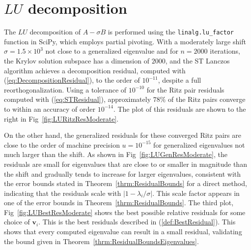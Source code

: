 \section{$LU$ decomposition}

The $LU$ decomposition of $A - \sigma B$ is performed using the \texttt{linalg.lu\_factor} function in SciPy, which employs partial pivoting. With a moderately large shift $\sigma = 1.5 \times 10^3$ not close to a generalized eigenvalue and for $n = 2000$ iterations, the Krylov solution subspace has a dimension of $2000$, and the ST Lanczos algorithm achieves a decomposition residual, computed with (\ref{eq:DecompositionResidual}), to the order of $10^{-11}$, despite a full reorthogonalization. Using a tolerance of $10^{-10}$ for the Ritz pair residuals computed with (\ref{eq:STResidual}), approximately $78\%$ of the Ritz pairs converge to within an accuracy of order $10^{-14}$. The plot of this residuals are shown to the right in Fig~\ref{fig:LURitzResModerate}.

On the other hand, the generalized residuals for these converged Ritz pairs are close to the order of machine precision $u=10^{-15}$ for generalized eigenvalues not much larger than the shift. As shown in Fig~\ref{fig:LUGenResModerate}, the residuals are small for eigenvalues that are close to or smaller in magnitude than the shift and gradually tends to increase for larger eigenvalues, consistent with the error bounds stated in Theorem~\ref{thrm:ResidualBounds} for a direct method, indicating that the residuals scale with $\lvert 1-\lambda_i/\sigma\rvert$. This scale factor appears in one of the error bounds in Theorem~\ref{thrm:ResidualBounds}. The third plot, Fig~\ref{fig:LUBestResModerate} shows the best possible relative residuals for some choice of $\mathbf{v}_i$. This is the best residuals described in (\ref{def:BestResidual}). This shows that every computed eigenvalue can result in a small residual, validating the bound given in Theorem~\ref{thrm:ResidualBoundsEigenvalues}.

